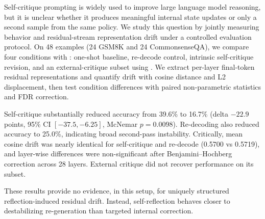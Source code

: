 Self-critique prompting is widely used to improve large language model reasoning, but it is unclear whether it produces meaningful internal state updates or only a second sample from the same policy. We study this question by jointly measuring behavior and residual-stream representation drift under a controlled evaluation protocol. On 48 examples (24 GSM8K and 24 CommonsenseQA), we compare four conditions with \qwen: one-shot baseline, re-decode control, intrinsic self-critique revision, and an external-critique subset using \gptfourone. We extract per-layer final-token residual representations and quantify drift with cosine distance and L2 displacement, then test condition differences with paired non-parametric statistics and FDR correction.

Self-critique substantially reduced accuracy from 39.6\% to 16.7\% (delta $-22.9$ points, 95\% CI $[-37.5,-6.25]$, McNemar $p=0.0098$). Re-decoding also reduced accuracy to 25.0\%, indicating broad second-pass instability. Critically, mean cosine drift was nearly identical for self-critique and re-decode (0.5700 vs 0.5719), and layer-wise differences were non-significant after Benjamini--Hochberg correction across 28 layers. External critique did not recover performance on its subset.

These results provide no evidence, in this setup, for uniquely structured reflection-induced residual drift. Instead, self-reflection behaves closer to destabilizing re-generation than targeted internal correction.
